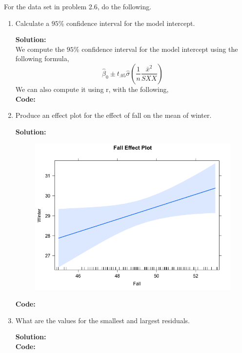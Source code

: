 \documentclass[12pt]{article}
\makeatletter
\theoremstyle{homework}
\newenvironment{exercise}[1]
{\def\@currentlabel{#1}\exercisecore}
{\endexercisecore}
\newcommand{\localhead}[1]{\par\smallskip\noindent\textbf{#1}\nobreak\\}%
\newcommand\solution{\localhead{Solution:}}
\makeatother
\begin{document}
\begin{exercise}{2} For the data set in problem 2.6, do the following.
  \begin{enumerate}
    \item Calculate a $95\%$ confidence interval for the model intercept.\\
    \solution We compute the $95\%$ confidence interval for the model intercept
    using the following formula, 
    \begin{equation*}
      \hat{\beta}_0 \pm t_{.05}\hat{\sigma}\left(\dfrac{1}{n} \dfrac{\bar{x}^2}{SXX}\right)
    \end{equation*}
    We can also compute it using r, with the following,\\
    \textbf{Code:}
    \begin{center}
    
    \end{center} 
    \newpage

    \item Produce an effect plot for the effect of fall on the mean of winter. \\
    \solution
    \begin{figure}[H]
      \begin{center}
      \includegraphics[width = .75 \textwidth]{Rplot02.png}
      \end{center}
    \end{figure}
        \textbf{Code:}
        \begin{center}
        
        \end{center}
    \newpage

    \item What are the values for the smallest and largest residuals. \\
    \solution
    \textbf{Code:}
    \begin{center}
    
    \end{center}
    \newpage


\end{enumerate}
\end{exercise}
\end{document}
